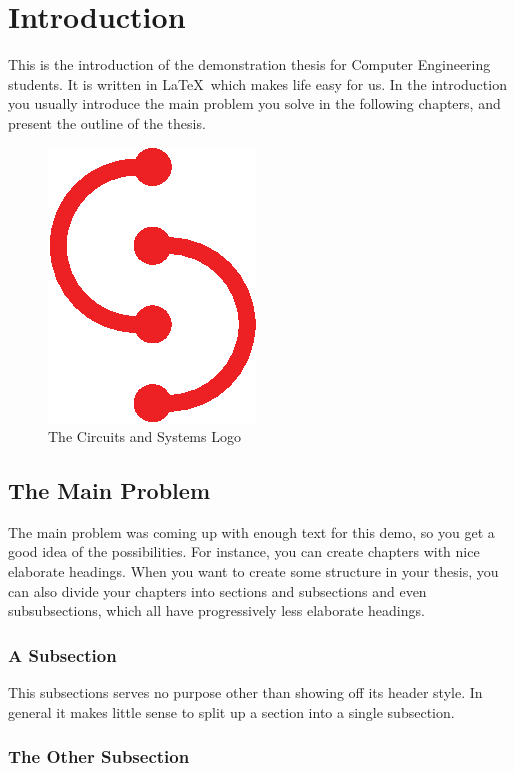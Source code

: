 \chapter{Introduction}

This is the introduction of the demonstration thesis for Computer Engineering students. It is written in \LaTeX\ which makes life easy for us. In the introduction you usually introduce the main problem you solve in the following chapters, and present the outline of the thesis. 

\begin{figure}%
\centering%
\includegraphics{style/cas}%
\caption{The Circuits and Systems Logo}%
\label{sample figure}%
\end{figure}

\section{The Main Problem}

The main problem was coming up with enough text for this demo, so you get a good idea of the possibilities. For instance, you can create chapters with nice elaborate headings. When you want to create some structure in your thesis, you can also divide your chapters into sections and subsections and even subsubsections, which all have progressively less elaborate headings.

\subsection{A Subsection}

This subsections serves no purpose other than showing off its header style. In general it makes little sense to split up a section into a single subsection. 

\subsection{The Other Subsection}

